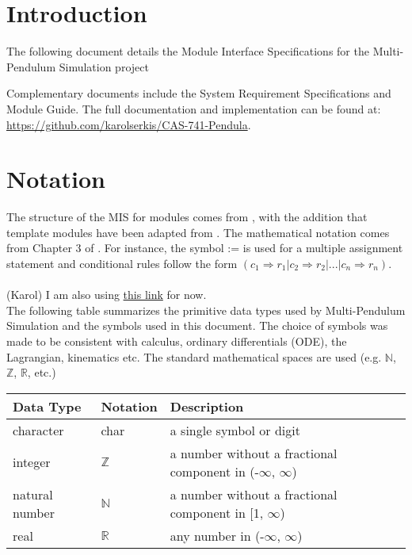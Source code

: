 \documentclass[12pt, titlepage]{article}
\newcommand{\progname}{Multi-Pendulum Simulation }
\begin{document}
\newpage

\tableofcontents

\newpage


\section{Introduction}

The following document details the Module Interface Specifications for the \progname project

Complementary documents include the System Requirement Specifications
and Module Guide. The full documentation and implementation can be
found at: \\\url{https://github.com/karolserkis/CAS-741-Pendula}.  

\section{Notation}


The structure of the MIS for modules comes from \citet{HoffmanAndStrooper1995},
with the addition that template modules have been adapted from
\cite{GhezziEtAl2003}.  The mathematical notation comes from Chapter 3 of
\citet{HoffmanAndStrooper1995}.  
For instance, the symbol := is used for a multiple assignment statement and conditional rules follow the form 
$(c_1 \Rightarrow r_1 | c_2 \Rightarrow r_2 | ... | c_n \Rightarrow r_n )$.\\\\
(Karol) I am also using \href{https://proofwiki.org/wiki/Symbols:R}{this link} for 
now.\\

The following table summarizes the primitive data types used by \progname and the symbols used in this document.
The choice of symbols was made to be consistent with calculus, ordinary
differentials (ODE), the Lagrangian, kinematics etc. The standard mathematical
spaces are used (e.g. $\mathbb{N}$, $\mathbb{Z}$, $\mathbb{R}$, etc.)

\begin{center}
\renewcommand{\arraystretch}{1.2}
\noindent 
\begin{tabular}{l l p{7.5cm}} 
\toprule 
\textbf{Data Type} & \textbf{Notation} & \textbf{Description}\\ 
\midrule
character & char & a single symbol or digit\\
integer & $\mathbb{Z}$ & a number without a fractional component in (-$\infty$, $\infty$) \\
natural number & $\mathbb{N}$ & a number without a fractional component in [1, $\infty$) \\
real & $\mathbb{R}$ & any number in (-$\infty$, $\infty$)\\
\bottomrule
\end{tabular} 
\end{center}
\end{document}
